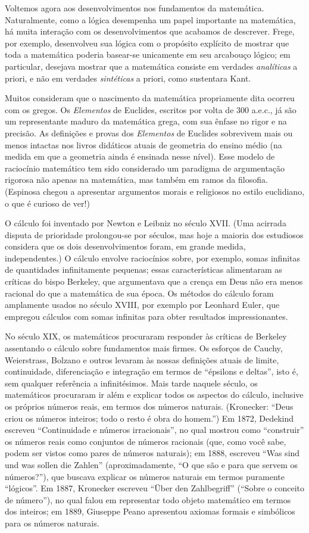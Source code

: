 \documentclass[../../../include/open-logic-section]{subfiles}
\begin{document}
Voltemos agora aos desenvolvimentos nos fundamentos da matemática.
Naturalmente, como a lógica desempenha um papel importante na
matemática, há muita interação com os desenvolvimentos que acabamos de
descrever. Frege, por exemplo, desenvolveu sua lógica com o propósito
explícito de mostrar que toda a matemática poderia basear-se unicamente
em seu arcabouço lógico; em particular, desejava mostrar que a
matemática consiste em verdades \emph{analíticas} a priori, e não em
verdades \emph{sintéticas} a priori, como sustentara Kant.

Muitos consideram que o nascimento da matemática propriamente dita
ocorreu com os gregos. Os \emph{Elementos} de Euclides, escritos por
volta de 300 a.e.c., já são um representante maduro da matemática
grega, com sua ênfase no rigor e na precisão. As definições e provas
dos \emph{Elementos} de Euclides sobrevivem mais ou menos intactas nos
livros didáticos atuais de geometria do ensino médio (na medida em que
a geometria ainda é ensinada nesse nível). Esse modelo de raciocínio
matemático tem sido considerado um paradigma de argumentação rigorosa
não apenas na matemática, mas também em ramos da filosofia. (Espinosa
chegou a apresentar argumentos morais e religiosos no estilo
euclidiano, o que é curioso de ver!)

O cálculo foi inventado por Newton e Leibniz no século XVII. (Uma
acirrada disputa de prioridade prolongou-se por séculos, mas hoje a
maioria dos estudiosos considera que os dois desenvolvimentos foram,
em grande medida, independentes.) O cálculo envolve raciocínios sobre,
por exemplo, somas infinitas de quantidades infinitamente pequenas;
essas características alimentaram as críticas do bispo Berkeley, que
argumentava que a crença em Deus não era menos racional do que a
matemática de sua época. Os métodos do cálculo foram amplamente usados
no século XVIII, por exemplo por Leonhard Euler, que empregou cálculos
com somas infinitas para obter resultados impressionantes.

No século XIX, os matemáticos procuraram responder às críticas de
Berkeley assentando o cálculo sobre fundamentos mais firmes. Os
esforços de Cauchy, Weierstrass, Bolzano e outros levaram às nossas
definições atuais de limite, continuidade, diferenciação e integração
em termos de ``épsilons e deltas'', isto é, sem qualquer referência a
infinitésimos. Mais tarde naquele século, os matemáticos procuraram ir
além e explicar todos os aspectos do cálculo, inclusive os próprios
números reais, em termos dos números naturais. (Kronecker: ``Deus criou
os números inteiros; todo o resto é obra do homem.'') Em 1872, Dedekind
escreveu ``Continuidade e números irracionais'', no qual mostrou como
``construir'' os números reais como conjuntos de números racionais
(que, como você sabe, podem ser vistos como pares de números naturais);
em 1888, escreveu ``Was sind und was sollen die Zahlen'' (aproximadamente,
``O que são e para que servem os números?''), que buscava explicar os
números naturais em termos puramente ``lógicos''. Em 1887, Kronecker
escreveu ``\"Uber den Zahlbegriff'' (``Sobre o conceito de número''),
no qual falou em representar todo objeto matemático em termos dos
inteiros; em 1889, Giuseppe Peano apresentou axiomas formais e
simbólicos para os números naturais.
\end{document}
